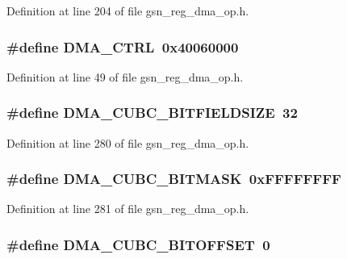 Definition at line 204 of file gsn\_\-reg\_\-dma\_\-op.h.

\hypertarget{a00547_a8a7d92a4f5077c21611200903b7fe8b6}{
\subsubsection[{DMA\_\-CTRL}]{\setlength{\rightskip}{0pt plus 5cm}\#define DMA\_\-CTRL~0x40060000}}
\label{a00547_a8a7d92a4f5077c21611200903b7fe8b6}


Definition at line 49 of file gsn\_\-reg\_\-dma\_\-op.h.

\hypertarget{a00547_adb6f5ea392a7d8e8a6554096eed8fd81}{
\subsubsection[{DMA\_\-CUBC\_\-BITFIELDSIZE}]{\setlength{\rightskip}{0pt plus 5cm}\#define DMA\_\-CUBC\_\-BITFIELDSIZE~32}}
\label{a00547_adb6f5ea392a7d8e8a6554096eed8fd81}


Definition at line 280 of file gsn\_\-reg\_\-dma\_\-op.h.

\hypertarget{a00547_a50a757f8b7afdafeb9a9ce72799cbbb6}{
\subsubsection[{DMA\_\-CUBC\_\-BITMASK}]{\setlength{\rightskip}{0pt plus 5cm}\#define DMA\_\-CUBC\_\-BITMASK~0xFFFFFFFF}}
\label{a00547_a50a757f8b7afdafeb9a9ce72799cbbb6}


Definition at line 281 of file gsn\_\-reg\_\-dma\_\-op.h.

\hypertarget{a00547_a8c931af4b32c78702551037d3a575726}{
\subsubsection[{DMA\_\-CUBC\_\-BITOFFSET}]{\setlength{\rightskip}{0pt plus 5cm}\#define DMA\_\-CUBC\_\-BITOFFSET~0}}
\label{a00547_a8c931af4b32c78702551037d3a575726}


